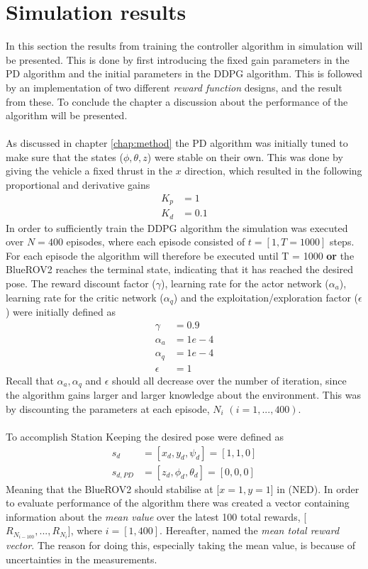 \chapter{Simulation results} \label{ch:results}
In this section the results from training the controller algorithm in simulation will be presented. This is done by first introducing the fixed gain parameters in the PD algorithm and the initial parameters in the DDPG algorithm. This is followed by an implementation of two different \textit{reward function} designs, and the result from these. To conclude the chapter a discussion about the performance of the algorithm will be presented.\\\\
As discussed in chapter \ref{chap:method} the PD algorithm was initially tuned to make sure that the states ($\phi, \theta, z$) were stable on their own. This was done by giving the vehicle a fixed thrust in the $x$ direction, which resulted in the following proportional and derivative gains
\begin{align}
    K_{p} & = 1 \\
    K_{d} & = 0.1
\end{align}
In order to sufficiently train the DDPG algorithm the simulation was executed over $N = 400$ episodes, where each episode consisted of $t = [1, T=1000]$ steps. For each episode the algorithm will therefore be executed until T = 1000 \textbf{or} the BlueROV2 reaches the terminal state, indicating that it has reached the desired pose. The reward discount factor ($\gamma$), learning rate for the actor network ($\alpha_{a}$), learning rate for the critic network ($\alpha_{q}$) and the exploitation/exploration factor ($\epsilon$) were initially defined as
\begin{align}
    \gamma & = 0.9 \\
    \alpha_{a} & = 1e-4 \\
    \alpha_{q} & = 1e-4 \\
    \epsilon & = 1
\end{align}
Recall that $\alpha_{a}, \alpha_{q}$ and $\epsilon$ should all decrease over the number of iteration, since the algorithm gains larger and larger knowledge about the environment. This was by discounting the parameters at each episode, $N_{i}$ $(i = 1,...,400)$.\\\\
To accomplish Station Keeping the desired pose were defined as
\begin{align}
    s_{d} & = [x_{d}, y_{d}, \psi_{d}] = [1, 1, 0] \\
    s_{d,PD} & = [z_{d}, \phi_{d}, \theta_{d}] = [0, 0, 0]
\end{align}
Meaning that the BlueROV2 should stabilise at [$x = 1, y = 1$] in (NED). In order to evaluate performance of the algorithm there was created a vector containing information about the \textit{mean value} over the latest 100 total rewards, [$R_{N_{i-100}}, ..., R_{N_{i}}$], where $i = [1, 400]$. Hereafter, named the \textit{mean total reward vector}. The reason for doing this, especially taking the mean value, is because of uncertainties in the measurements. 
